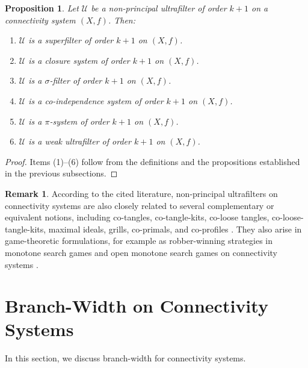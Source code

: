 \documentclass[10pt]{book}
\newtheorem{proposition}[theorem]{Proposition}
\theoremstyle{definition}
\newtheorem{remark}[theorem]{Remark}
\begin{document}
\begin{proposition}
\label{prop:ultrafilter-summary}
Let \(\mathcal{U}\) be a non-principal ultrafilter of order \(k+1\)
on a connectivity system \((X,f)\). Then:
\begin{enumerate}
    \item \(\mathcal{U}\) is a superfilter of order \(k+1\) on \((X,f)\).
    \item \(\mathcal{U}\) is a closure system of order \(k+1\) on \((X,f)\).
    \item \(\mathcal{U}\) is a \(\sigma\)-filter of order \(k+1\) on \((X,f)\).
    \item \(\mathcal{U}\) is a co-independence system of order \(k+1\) on \((X,f)\).
    \item \(\mathcal{U}\) is a \(\pi\)-system of order \(k+1\) on \((X,f)\).
    \item \(\mathcal{U}\) is a weak ultrafilter of order \(k+1\) on \((X,f)\).
\end{enumerate}
\end{proposition}

\begin{proof}
Items (1)--(6) follow from the definitions and the propositions established in the previous subsections.
\end{proof}

\begin{remark}
\label{rem:related-concepts-ultrafilter}
According to the cited literature, non-principal ultrafilters on connectivity systems
are also closely related to several complementary or equivalent notions,
including co-tangles, co-tangle-kits, co-loose tangles, co-loose-tangle-kits,
maximal ideals, grills, co-primals, and co-profiles
\cite{16,Oum2006CertifyingLB,93,49,FujitaGrill2024,1}.
They also arise in game-theoretic formulations, for example as robber-winning strategies
in monotone search games and open monotone search games on connectivity systems
\cite{16}.
\end{remark}


\section{Branch-Width on Connectivity Systems}

In this section, we discuss branch-width for connectivity systems.
\end{document}
